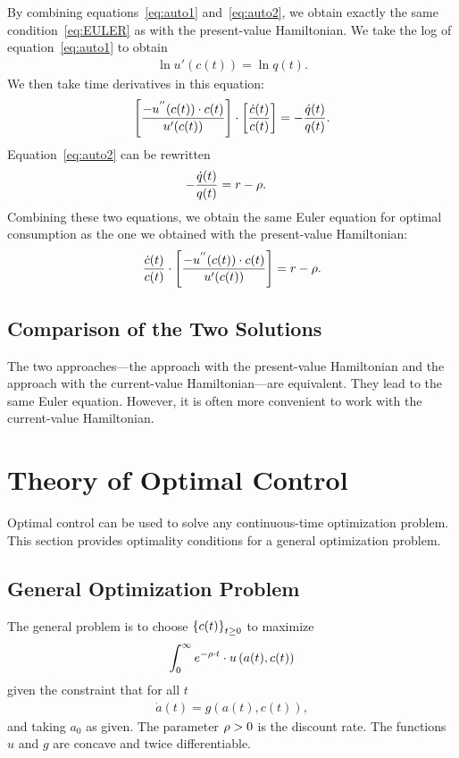 \documentclass[letterpaper,12pt,leqno]{article}
\begin{document}
By combining equations~\eqref{eq:auto1} and~\eqref{eq:auto2}, we obtain exactly the same condition~\eqref{eq:EULER} as with the present-value Hamiltonian. We take the log of equation~\eqref{eq:auto1} to obtain
\begin{align*}
\ln{u'(c(t))} = \ln{q(t)}.
\end{align*}
We then take time derivatives in this equation:
\begin{equation*}
\left[  \frac{-u^{''}(c(t)) \cdot c(t)}{u'(c(t))} \right]\cdot \left[ \frac{\dot{c}(t)}{c(t)} \right] =-\frac{\dot{q}(t)}{q(t)}.
\end{equation*}
Equation~\eqref{eq:auto2} can be rewritten
\begin{align*}
-\frac{\dot{q}(t)}{q(t)}&= r-\rho.
\end{align*}
Combining these two equations, we obtain the same Euler equation for optimal consumption as the one we obtained with the present-value Hamiltonian:
\begin{equation*}
\frac{\dot{c}(t)}{c(t)}\cdot \left[ \frac{-u^{''}(c(t)) \cdot c(t)}{u'(c(t)) } \right] =r-\rho.
\end{equation*}

\subsection{Comparison of the Two Solutions}

The two approaches---the approach with the present-value Hamiltonian and the approach with the current-value Hamiltonian---are equivalent. They lead to the same Euler equation. However, it is often more convenient to work with the current-value Hamiltonian.

\section{Theory of Optimal Control}

Optimal control can be used to solve any continuous-time optimization problem. This section provides optimality conditions for a general optimization problem.

\subsection{General Optimization Problem}

The general problem is to choose $\left\lbrace c(t) \right\rbrace_{t\geq 0}$ to maximize
\begin{align}
\int_{0}^{\infty}e^{-\rho\cdot  t}\cdot  u\left(  a(t),c(t) \right)\label{dpc} 
\end{align}
given the constraint that for all $t$
\begin{align}
\dot{a}(t) = g(a(t),c(t)),\label{eq:thelaw}
\end{align}
and taking $a_{0}$ as given. The parameter $\rho >0$ is the discount rate. The functions $u$ and $g$ are concave and twice differentiable.
\end{document}
